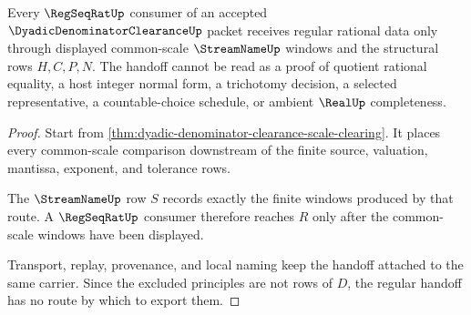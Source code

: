 \begin{theorem}
\label{thm:dyadic-denominator-clearance-regseqrat-handoff}
Every $\RegSeqRatUp$ consumer of an accepted $\DyadicDenominatorClearanceUp$ packet receives regular rational data only through displayed common-scale $\StreamNameUp$ windows and the structural rows $H,C,P,N$. The handoff cannot be read as a proof of quotient rational equality, a host integer normal form, a trichotomy decision, a selected representative, a countable-choice schedule, or ambient $\RealUp$ completeness.
\end{theorem}
\begin{proof}
Start from \autoref{thm:dyadic-denominator-clearance-scale-clearing}. It places every common-scale comparison downstream of the finite source, valuation, mantissa, exponent, and tolerance rows.

The $\StreamNameUp$ row $S$ records exactly the finite windows produced by that route. A $\RegSeqRatUp$ consumer therefore reaches $R$ only after the common-scale windows have been displayed.

Transport, replay, provenance, and local naming keep the handoff attached to the same carrier. Since the excluded principles are not rows of $D$, the regular handoff has no route by which to export them.
\end{proof}




